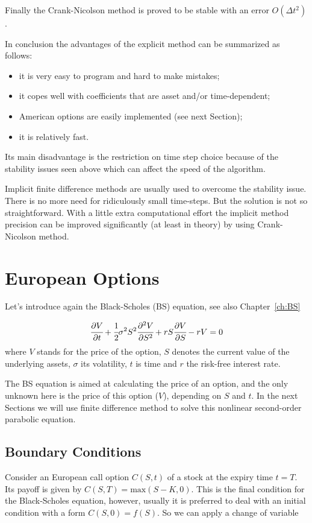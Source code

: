 Finally the Crank-Nicolson method is proved to be stable with an error $O(\Delta t^2)$. 

In conclusion the advantages of the explicit method can be summarized as follows:
\begin{itemize}
\tightlist
\item it is very easy to program and hard to make mistakes;
\item it copes well with coefficients that are asset and/or time-dependent;
\item American options are easily implemented (see next Section);
\item it is relatively fast.
\end{itemize}

Its main disadvantage is the restriction on time step choice because of the stability issues seen above which can affect the speed of the algorithm.

Implicit finite difference methods are usually used to overcome the stability issue. There is no more need for ridiculously small time-steps. But the solution is not so straightforward. With a little extra computational effort the implicit method precision can be improved significantly (at least in theory) by using Crank-Nicolson method. 

\section{European Options}
Let's introduce again the Black-Scholes (BS) equation, see also Chapter~\ref{ch:BS}

\begin{equation}
\cfrac{\partial V}{\partial t} + \cfrac{1}{2} \sigma^2 S^2 \cfrac{\partial^2 V}{\partial S^2}+ rS \cfrac{\partial V}{\partial S} - rV = 0
\label{eq:bs_differential_equation}
\end{equation}
\noindent
where $V$ stands for the price of the option, $S$ denotes the current value of the underlying assets, $\sigma$ its volatility, $t$ is time and $r$ the risk-free interest rate.

The BS equation is aimed at calculating the price of an option, and the only unknown here is the price of this option ($V$), depending on $S$ and $t$. In the next Sections we will use finite difference method to solve this nonlinear second-order parabolic equation.

\subsection{Boundary Conditions}
Consider an European call option $C(S, t)$ of a stock at the expiry time $t=T$. Its payoff is given by $C(S, T) = \textrm{max}(S-K, 0)$. This is the final condition for the Black-Scholes equation, however, usually it is preferred to deal with an initial condition with a form  $C(S,0)=f(S)$. So we can apply a change of variable

